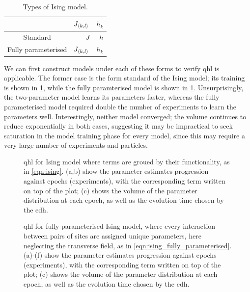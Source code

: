 \begin{table}
    \begin{center}
        \begin{tabular}{crr}
             & $J_{{ \langle k, l \rangle }}$  & $h_{k}$ \\
            \hline
            Standard & $J$ & $h$ \\
            Fully parameterised & $J_{{ \langle k, l \rangle }}$ & $h_{k}$
        \end{tabular}
    \end{center}
    \caption[Types of Ising model]{Types of Ising model.}
    \label{table:ising_models}
\end{table}

\par 

We can first construct models under each of these forms to verify \gls{qhl} is applicable. 
The former case is the form standard of the Ising model; its training is shown in \cref{fig:ising_two_param_learning}, 
    while the fully paramterised model is shown in \cref{fig:ising_two_param_learning}. 
Unsurprisingly, the two-parameter model learns its parameters faster, 
    whereas the fully parameterised model required double the number of experiments to learn the parameters well. 
Interestingly, neither model converged; the \gls{volume} continues to reduce exponentially in both cases, 
    suggesting it may be impractical to seek saturation in the model training phase for every model, 
    since this may require a very large number of experiments and particles. 

\begin{figure}
    \caption[\gls{qhl} for Ising model]{
        \gls{qhl} for Ising model where terms are groued by their functionality, 
        as in \cref{eqn:ising}. 
        (a,b) show the parameter estimates progression against 
        epochs (experiments), with the corresponding term written on top of the plot; 
        (c) shows the \gls{volume} of the parameter distribution at each epoch, as well as the 
        evolution time chosen by the \gls{edh}. 
        \figtableref
    }
    \label{fig:ising_two_param_learning}
\end{figure}

\begin{figure}
    \caption[\gls{qhl} for Ising model]{
        \gls{qhl} for fully parameterised Ising model, 
            where every interaction between pairs of sites are assigned unique parameters, 
            here neglecting the transverse field, 
            as in \cref{eqn:ising_fully_parameterised}. 
        (a)-(f) show the parameter estimates progression against 
        epochs (experiments), with the corresponding term written on top of the plot; 
        (c) shows the \gls{volume} of the parameter distribution at each epoch, as well as the 
        evolution time chosen by the \gls{edh}. 
        \figtableref
    }
    \label{fig:ising_fully_parameterised}
\end{figure}


